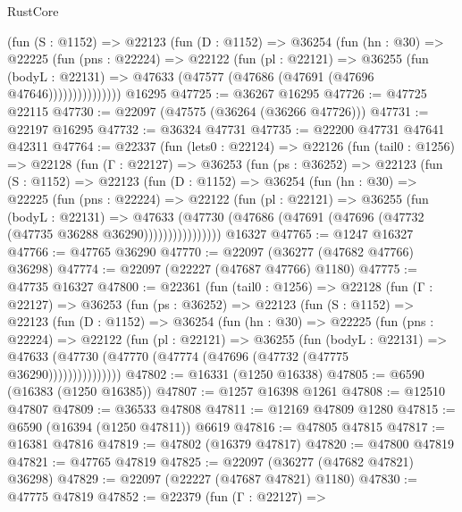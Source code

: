 \begin{lexlean}{RustCore}
\begin{coremodule}
              (fun (S : @1152) =>
              @22123
                (fun (D : @1152) =>
                @36254
                  (fun (hn : @30) =>
                  @22225
                    (fun (pns : @22224) =>
                    @22122
                      (fun (pl : @22121) =>
                      @36255
                        (fun (bodyL : @22131) =>
                        @47633 (@47577 (@47686 (@47691 (@47696 @47646)))))))))))))))
    @16295
@47725 := @36267 @16295
@47726 := @47725 @22115
@47730 := @22097 (@47575 (@36264 (@36266 @47726)))
@47731 := @22197 @16295
@47732 := @36324 @47731
@47735 := @22200 @47731 @47641 @42311
@47764 := @22337
    (fun (lets0 : @22124) =>
    @22126
      (fun (tail0 : @1256) =>
      @22128
        (fun (Γ : @22127) =>
        @36253
          (fun (ps : @36252) =>
          @22123
            (fun (S : @1152) =>
            @22123
              (fun (D : @1152) =>
              @36254
                (fun (hn : @30) =>
                @22225
                  (fun (pns : @22224) =>
                  @22122
                    (fun (pl : @22121) =>
                    @36255
                      (fun (bodyL : @22131) =>
                      @47633
                        (@47730
                          (@47686 (@47691 (@47696 (@47732 (@47735 @36288 @36290))))))))))))))))
    @16327
@47765 := @1247 @16327
@47766 := @47765 @36290
@47770 := @22097 (@36277 (@47682 @47766) @36298)
@47774 := @22097 (@22227 (@47687 @47766) @1180)
@47775 := @47735 @16327
@47800 := @22361
    (fun (tail0 : @1256) =>
    @22128
      (fun (Γ : @22127) =>
      @36253
        (fun (ps : @36252) =>
        @22123
          (fun (S : @1152) =>
          @22123
            (fun (D : @1152) =>
            @36254
              (fun (hn : @30) =>
              @22225
                (fun (pns : @22224) =>
                @22122
                  (fun (pl : @22121) =>
                  @36255
                    (fun (bodyL : @22131) =>
                    @47633 (@47730 (@47770 (@47774 (@47696 (@47732 (@47775 @36290)))))))))))))))
@47802 := @16331 (@1250 @16338)
@47805 := @6590 (@16383 (@1250 @16385))
@47807 := @1257 @16398 @1261
@47808 := @12510 @47807
@47809 := @36533 @47808
@47811 := @12169 @47809 @1280
@47815 := @6590 (@16394 (@1250 @47811)) @6619
@47816 := @47805 @47815
@47817 := @16381 @47816
@47819 := @47802 (@16379 @47817)
@47820 := @47800 @47819
@47821 := @47765 @47819
@47825 := @22097 (@36277 (@47682 @47821) @36298)
@47829 := @22097 (@22227 (@47687 @47821) @1180)
@47830 := @47775 @47819
@47852 := @22379
    (fun (Γ : @22127) =>

\end{coremodule}
\end{lexlean}

